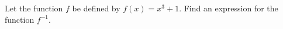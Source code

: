 Let the function $f$ be defined by $f(x)=x^3+1$.
Find an expression for the function $f^{-1}$.\answercheck

